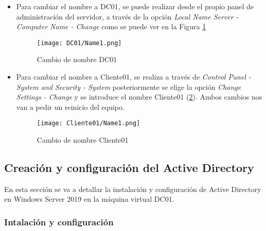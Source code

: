 \begin{itemize}
\item Para cambiar el nombre a DC01, se puede realizar desde el propio panel de administración del servidor, a través de la opción {\it Local Name Server - Computer Name - Change} como se puede ver en la Figura \ref{DC01-Name1}
\begin{figure}[H] %
\begin{center}
\texttt{[image: DC01/Name1.png]}
\end{center}
\caption{Cambio de nombre DC01}
\label{DC01-Name1}
\end{figure}

\item Para cambiar el nombre a Cliente01, se realiza a través de {\it Control Panel - System and Security - System} posteriormente se elige la opción {\it Change Settings - Change} y se introduce el nombre Cliente01 (\ref{Cliente01-Name1}). Ambos cambios nos van a pedir un reinicio del equipo.  
\begin{figure}[H] %
\begin{center}
\texttt{[image: Cliente01/Name1.png]}
\end{center}
\caption{Cambio de nombre Cliente01}
\label{Cliente01-Name1}
\end{figure}

\end{itemize}

\subsection{Creación y configuración del Active Directory}

En esta sección se va a detallar la instalación y configuración de Active Directory en Windows Server 2019 en la máquina virtual DC01.

\subsubsection{Intalación y configuración}

